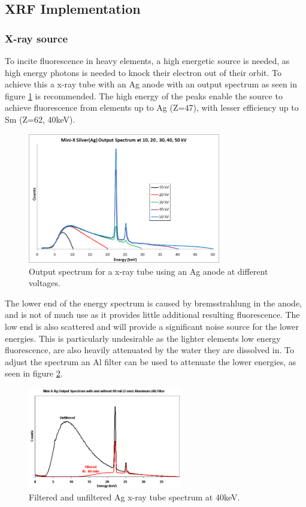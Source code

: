 \subsection{XRF Implementation}

\subsubsection{X-ray source}
To incite fluorescence in heavy elements, a high energetic source is needed, as high energy photons is needed to knock their electron out of their orbit. To achieve this a x-ray tube with an Ag anode with an output spectrum as seen in figure \ref{fig:AgSpectra} is recommended. The high energy of the peaks enable the source to achieve fluorescence from elements up to Ag (Z=47), with lesser efficiency up to Sm (Z=62, 40keV).

\begin{figure}[htb]
	\centering
	\includegraphics[width=0.75\textwidth]{figures/XRF/minix50_ag6.png}
	\caption{Output spectrum for a x-ray tube using an Ag anode at different voltages.\citep{AmptekSource}}
	\label{fig:AgSpectra}
\end{figure}

The lower end of the energy spectrum is caused by bremsstrahlung in the anode, and is not of much use as it provides little additional resulting fluorescence. The low end is also scattered and will provide a significant noise source for the lower energies. This is particularly undesirable as the lighter elements low energy fluorescence, are also heavily attenuated by the water they are dissolved in. To adjust the spectrum an Al filter can be used to attenuate the lower energies, as seen in figure \ref{fig:AgSpectraFilt}.

\begin{figure}[htb]
	\centering
	\includegraphics[width=0.6\textwidth]{figures/XRF/minix_Fil.png}
	\caption{Filtered and unfiltered Ag x-ray tube spectrum at 40keV. \citep{AmptekSource}}
	\label{fig:AgSpectraFilt}
\end{figure}


